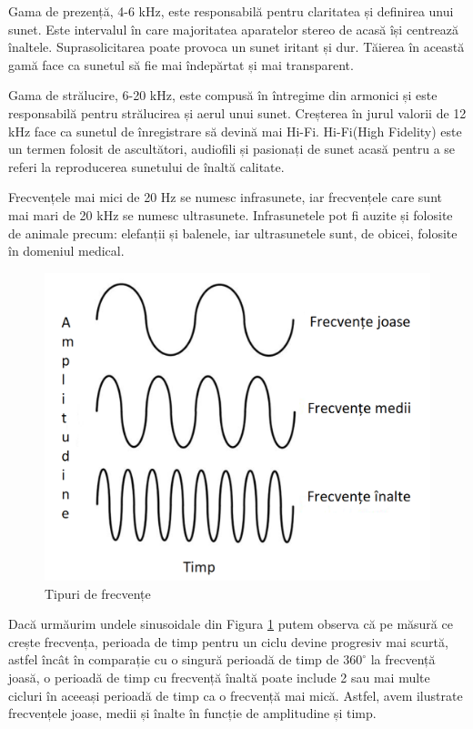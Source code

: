 	Gama de prezență, 4-6 kHz, este responsabilă pentru claritatea și definirea unui sunet. Este intervalul în care majoritatea aparatelor stereo de acasă își centrează înaltele. Suprasolicitarea poate provoca un sunet iritant și dur. Tăierea în această gamă face ca sunetul să fie mai îndepărtat și mai transparent.
	
	Gama de strălucire, 6-20 kHz, este compusă în întregime din armonici și este responsabilă pentru strălucirea și aerul unui sunet. Creșterea în jurul valorii de 12 kHz face ca sunetul de înregistrare să devină mai Hi-Fi. Hi-Fi(High Fidelity) este un termen folosit de ascultători, audiofili și pasionați de sunet acasă pentru a se referi la reproducerea sunetului de înaltă calitate.

	Frecvențele mai mici de 20 Hz se numesc infrasunete, iar frecvențele care sunt mai mari de 20 kHz se numesc ultrasunete. Infrasunetele pot fi auzite și folosite de animale precum: elefanții și balenele, iar ultrasunetele sunt, de obicei, folosite în domeniul medical.
	
	\begin{figure}[!htb]
		\centering
		\includegraphics[width=12cm]{imagini/ampli_timp.png}
		\caption{Tipuri de frecvențe}
		\label{Fig30}
	\end{figure}

	Dacă urmăurim undele sinusoidale din Figura \ref{Fig30} putem observa că pe măsură ce crește frecvența, perioada de timp pentru un ciclu devine progresiv mai scurtă, astfel încât în comparație cu o singură perioadă de timp de $360^\circ$ la frecvență joasă, o perioadă de timp cu frecvență înaltă poate include 2 sau mai multe cicluri în aceeași perioadă de timp ca o frecvență mai mică. Astfel, avem ilustrate frecvențele joase, medii și înalte în funcție de amplitudine și timp.
	
